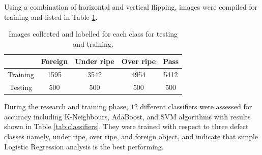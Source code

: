 \documentclass[fleqn,twoside,12pt]{report}
\begin{document}
Using a combination of horizontal and vertical flipping, images were compiled for training and listed in Table \ref{tab:data}.


\begin{table}[h]
	\centering
	\caption{Images collected and labelled for each class for testing and training.}
	\label{tab:data}
	\begin{tabular}{c c c c c} 
		\hline
		& Foreign & Under ripe & Over ripe & Pass \\ [0.5ex] 
		\hline
		Training & 1595 &  3542 & 4954 &  5412 \\
		Testing & 500 & 500 & 500 & 500 \\ [1ex] 
		\hline
	\end{tabular}
\end{table}



During the research and training phase, $12$ different classifiers were assessed for accuracy including K-Neighbours, AdaBoost, and SVM algorithms with results shown in Table \ref{tab:classifiers}. They were trained with respect to three defect classes namely, under ripe, over ripe, and foreign object, and indicate that simple Logistic Regression analysis is the best performing. 
\end{document}
